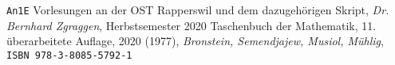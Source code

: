 \newcommand{\titleinfo}{Zusammenfassung An1ab}
\newcommand{\authorinfo}{Sandro Pedrett}
\newcommand{\version}{1.0}
\newcommand{\versioninfo}{HS20}


\newcommand{\bronstein}[1]{\verweisextern{Bronstein}{#1}}











\begin{thebibliography}{1}
	\texttt{An1E} Vorlesungen an der OST Rapperswil und dem dazugehörigen Skript,
	\textit{Dr. Bernhard Zgraggen}, Herbstsemester 2020
	Taschenbuch der Mathematik,
	11. \"uberarbeitete Auflage, 2020 (1977),
	\textit{Bronstein, Semendjajew, Musiol, M\"uhlig}, 
	\texttt{ISBN 978-3-8085-5792-1}
\end{thebibliography}
